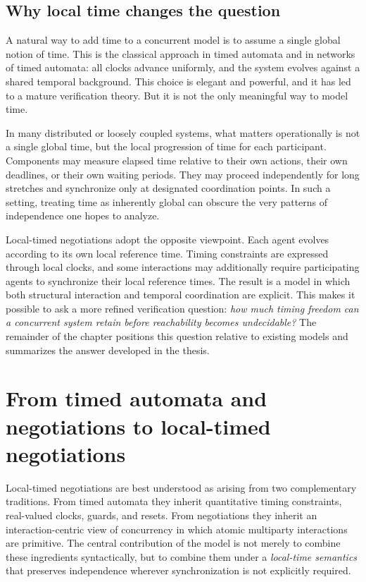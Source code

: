 \subsection{Why local time changes the question}

A natural way to add time to a concurrent model is to assume a single global notion of time. This is the classical approach in timed automata and in networks of timed automata: all clocks advance uniformly, and the system evolves against a shared temporal background. This choice is elegant and powerful, and it has led to a mature verification theory. But it is not the only meaningful way to model time.

In many distributed or loosely coupled systems, what matters operationally is not a single global time, but the local progression of time for each participant. Components may measure elapsed time relative to their own actions, their own deadlines, or their own waiting periods. They may proceed independently for long stretches and synchronize only at designated coordination points. In such a setting, treating time as inherently global can obscure the very patterns of independence one hopes to analyze.

Local-timed negotiations adopt the opposite viewpoint. Each agent evolves according to its own local reference time. Timing constraints are expressed through local clocks, and some interactions may additionally require participating agents to synchronize their local reference times. The result is a model in which both structural interaction and temporal coordination are explicit. This makes it possible to ask a more refined verification question: \emph{how much timing freedom can a concurrent system retain before reachability becomes undecidable?} The remainder of the chapter positions this question relative to existing models and summarizes the answer developed in the thesis.


\section{From timed automata and negotiations to local-timed negotiations}
\label{sec:intro-positioning}

Local-timed negotiations are best understood as arising from two complementary traditions. From timed automata they inherit quantitative timing constraints, real-valued clocks, guards, and resets. From negotiations they inherit an interaction-centric view of concurrency in which atomic multiparty interactions are primitive. The central contribution of the model is not merely to combine these ingredients syntactically, but to combine them under a \emph{local-time semantics} that preserves independence wherever synchronization is not explicitly required.

